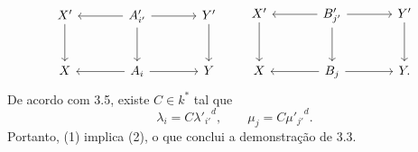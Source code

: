 \[
\begin{tikzcd}[column sep=large,row sep=large]
X' \arrow[d] & A'_{i'} \arrow[l] \arrow[r] \arrow[d] & Y' \arrow[d]\\
X & A_i \arrow[l] \arrow[r] & Y
\end{tikzcd}
\qquad
\begin{tikzcd}[column sep=large,row sep=large]
X' \arrow[d] & B'_{j'} \arrow[l] \arrow[r] \arrow[d] & Y' \arrow[d]\\
X & B_j \arrow[l] \arrow[r] & Y .
\end{tikzcd}
\]
De acordo com 3.5, existe $C\in k^*$ tal que
\[
\lambda_i=C{\lambda'_{i'}}^d,\qquad
\mu_j=C{\mu'_{j'}}^d.
\]
Portanto, (1) implica (2), o que conclui a demonstração de 3.3.
